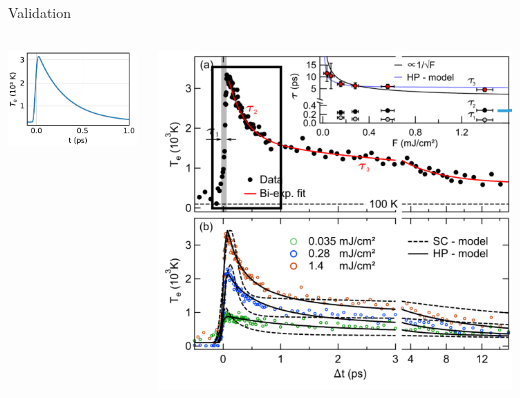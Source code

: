 \begin{frame}{Validation}
	\vfill
	\begin{columns}
		\includegraphics{../model/figures/temperature stange_hot_2015.pdf}

		\includegraphics[width=\textwidth]{./figures/stange_hot_2015.pdf}
	\end{columns}
\end{frame}

